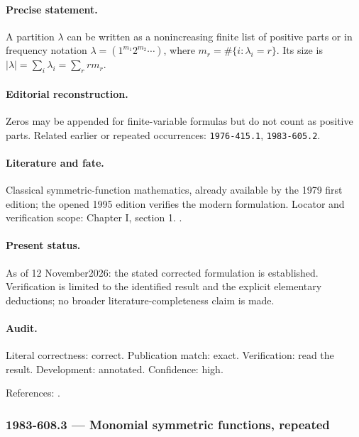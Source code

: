 \paragraph{Precise statement.} A partition \(\lambda\) can be written as a nonincreasing finite list of positive parts or in frequency notation \(\lambda=(1^{m_1}2^{m_2}\cdots)\), where \(m_r=\#\{i:\lambda_i=r\}\). Its size is \(|\lambda|=\sum_i\lambda_i=\sum_r rm_r\).

\paragraph{Editorial reconstruction.} Zeros may be appended for finite-variable formulas but do not count as positive parts. Related earlier or repeated occurrences: \texttt{1976-415.1}, \texttt{1983-605.2}.

\paragraph{Literature and fate.} Classical symmetric-function mathematics, already available by the 1979 first edition; the opened 1995 edition verifies the modern formulation. Locator and verification scope: Chapter I, section 1. \cite{macdonald1995symmetric}.

\paragraph{Present status.} As of 12 November2026: the stated corrected formulation is established. Verification is limited to the identified result and the explicit elementary deductions; no broader literature-completeness claim is made.

\paragraph{Audit.} Literal correctness: correct. Publication match: exact. Verification: read the result. Development: annotated. Confidence: high.

\noindent References: \citep{macdonald1995symmetric}.\par

\subsubsection{1983-608.3 --- Monomial symmetric functions, repeated}

\label{item:1983-608.3}

